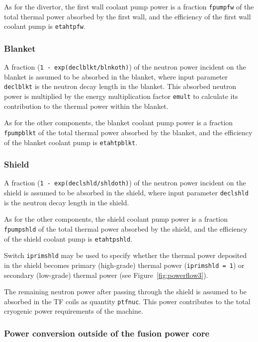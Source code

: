 \documentclass[11pt,a4paper]{report}
\begin{document}
As for the divertor, the first wall coolant pump power is a fraction
\texttt{fpumpfw} of the total thermal power absorbed by the first wall, and
the efficiency of the first wall coolant pump is \texttt{etahtpfw}.

\subsubsection{Blanket}

A fraction (\texttt{1 - exp(declblkt/blnkoth)}) of the neutron power incident
on the blanket is assumed to be absorbed in the blanket, where input parameter
\texttt{declblkt} is the neutron decay length in the blanket. This absorbed
neutron power is multiplied by the energy multiplication factor \texttt{emult}
to calculate its contribution to the thermal power within the blanket.

As for the other components, the blanket coolant pump power is a fraction
\texttt{fpumpblkt} of the total thermal power absorbed by the blanket, and
the efficiency of the blanket coolant pump is \texttt{etahtpblkt}.

\subsubsection{Shield}

A fraction (\texttt{1 - exp(declshld/shldoth)}) of the neutron power incident
on the shield is assumed to be absorbed in the shield, where input parameter
\texttt{declshld} is the neutron decay length in the shield.

As for the other components, the shield coolant pump power is a fraction
\texttt{fpumpshld} of the total thermal power absorbed by the shield, and
the efficiency of the shield coolant pump is \texttt{etahtpshld}.

Switch \texttt{iprimshld} may be used to specify whether the thermal power
deposited in the shield becomes primary (high-grade) thermal power
(\texttt{iprimshld = 1}) or secondary (low-grade) thermal power (see
Figure~\ref{fig:powerflow3}).

The remaining neutron power after passing through the shield is assumed to be
absorbed in the TF coils as quantity \texttt{ptfnuc}. This power contributes
to the total cryogenic power requirements of the machine.

\subsubsection{Power conversion outside of the fusion power core}
\end{document}
